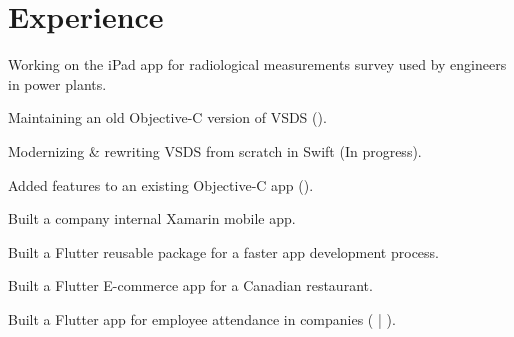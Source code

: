 \documentclass[]{Resume}
\begin{document}
\hfill
\begin{minipage}[t]{0.63\textwidth} 


\section{Experience}

\vspace{\topsep} %
\begin{tightemize}
\item Working on the  iPad app for radiological measurements survey used by engineers in power plants.
\item Maintaining an old Objective-C version of VSDS ().
\item Modernizing \& rewriting VSDS from scratch in Swift (In progress).
\end{tightemize}
\sectionsep

\begin{tightemize}
\item Added features to an existing Objective-C app ().
\item Built a company internal Xamarin mobile app.
\item Built a Flutter reusable package for a faster app development process.
\item Built a Flutter E-commerce app for a Canadian restaurant.
\item Built a Flutter app for employee attendance in companies ( | ).
\end{tightemize}
\sectionsep


\end{minipage}
\end{document}
